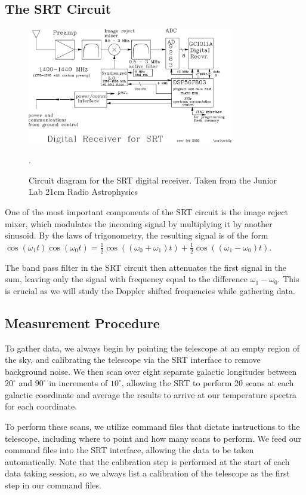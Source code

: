 \documentclass[aps,twocolumn,secnumarabic,balancelastpage,amsmath,amssymb,nofootinbib, floatfix]{revtex4-2}
\begin{document}
	\subsection{The SRT Circuit}
		\begin{figure}[H]
		\includegraphics[width=9cm]{circuit_diagram.png}
		\caption{Circuit diagram for the SRT digital receiver. Taken from the Junior Lab 21cm Radio Astrophysics \cite{labmanual}}.
		\label{fig:circuit}
	\end{figure}
	One of the most important components of the SRT circuit is the image reject mixer, which modulates the incoming signal by multiplying it by another sinusoid. By the laws of trigonometry, the resulting signal is of the form $\cos(\omega_{1}t)\cos(\omega_{0}t)=\frac{1}{2}\cos((\omega_{0}+\omega_1)t)+\frac{1}{2}\cos((\omega_{1}-\omega_{0})t)$.
	
	The band pass filter in the SRT circuit then attenuates the first signal in the sum, leaving only the signal with frequency equal to the difference $\omega_{1}-\omega_{0}$. This is crucial as we will study the Doppler shifted frequencies while gathering data. 

	
	\subsection{Measurement Procedure}
	To gather data, we always begin by pointing the telescope at an empty region of the sky, and calibrating the telescope via the SRT interface to remove background noise. We then scan over eight separate galactic longitudes between $20^{\circ}$ and $90^{\circ}$ in increments of $10^{\circ}$, allowing the SRT to perform 20 scans at each galactic coordinate and average the results to arrive at our temperature spectra for each coordinate. 
	
	To perform these scans, we utilize command files that dictate instructions to the telescope, including where to point and how many scans to perform. We feed our command files into the SRT interface, allowing the data to be taken automatically. Note that the calibration step is performed at the start of each data taking session, so we always list a calibration of the telescope as the first step in our command files.  
	
\end{document}
